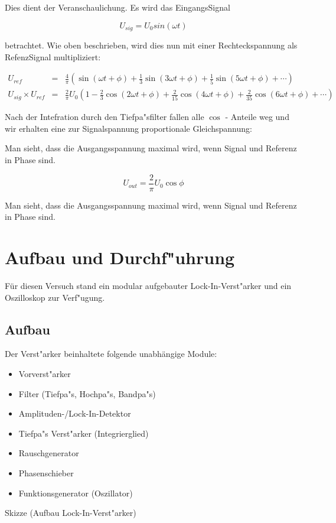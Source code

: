 \documentclass{scrartcl}
\begin{document}
			Dies dient der Veranschaulichung. Es wird das EingangsSignal

			\begin{displaymath}
				U_{sig} = U_0 sin(\omega t)
			\end{displaymath}

			betrachtet. Wie oben beschrieben,
			wird dies nun mit einer Rechteckspannung als RefenzSignal multipliziert:

			\begin{eqnarray*}
				U_{ref} &=& \frac{4}{\pi}
					\left( \sin(\omega t + \phi) + 
						\frac{1}{3} \sin(3 \omega t + \phi) + 
						\frac{1}{5} \sin(5 \omega t + \phi) + 
						\cdots 
					\right)	\\
				U_{sig} \times U_{ref} &=& \frac{2}{\pi} U_0 
				\left(
					1 - 
					\frac{2}{3}\cos(2 \omega t + \phi) + 
					\frac{2}{15} \cos(4 \omega t + \phi) + 
					\frac{2}{35} \cos(6 \omega t + \phi) + 
					\cdots 
				\right)
			\end{eqnarray*}

			Nach der Intefration durch den Tiefpa"sfilter fallen alle $\cos$ - Anteile weg und wir erhalten eine zur Signalspannung proportionale Gleichspannung:


			Man sieht, dass die Ausgangsspannung maximal wird, wenn Signal und Referenz in Phase sind.
		 

			\begin{equation}
				U_{out} = \frac{2}{\pi} U_0 \cos{\phi} \label{theorie}
			\end{equation}


			Man sieht, dass die Ausgangsspannung maximal wird, wenn Signal und Referenz in Phase sind.

	\section{Aufbau und Durchf"uhrung}


		Für diesen Versuch stand ein modular aufgebauter Lock-In-Verst"arker und ein Oszilloskop zur Verf"ugung.
		
		\subsection{Aufbau}
	
			Der Verst"arker beinhaltete folgende unabhängige Module:\label{module}
	
			\begin{itemize}
				\item Vorverst"arker
				\item Filter (Tiefpa"s, Hochpa"s, Bandpa"s)
				\item Amplituden-/Lock-In-Detektor
				\item Tiefpa"s Verst"arker (Integrierglied)
				\item Rauschgenerator
				\item Phasenschieber
				\item Funktionsgenerator (Oszillator)
			\end{itemize}
			Skizze (Aufbau Lock-In-Verst"arker)
\end{document}
